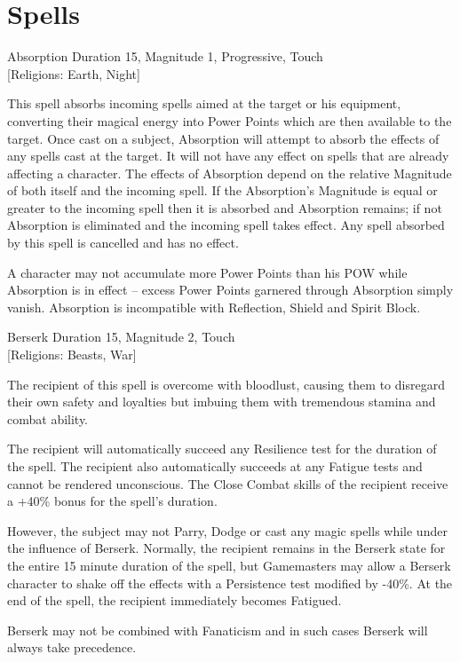 \section{Spells}

\begin{rpg-spell}
{Absorption}
{Duration 15, Magnitude 1, Progressive, Touch\\{[Religions: Earth, Night]}}

This spell absorbs incoming spells aimed at the target or his equipment, converting their magical energy into Power Points which are then available to the target. Once cast on a subject, Absorption will attempt to absorb the effects of any spells cast at the target. It will not have any effect on spells that are already affecting a character. The effects of Absorption depend on the relative Magnitude of both itself and the incoming spell. If the Absorption's Magnitude is equal or greater to the incoming spell then it is absorbed and Absorption remains; if not Absorption is eliminated and the incoming spell takes effect. Any spell absorbed by this spell is cancelled and has no effect. 

A character may not accumulate more Power Points than his POW while Absorption is in effect – excess Power Points garnered through Absorption simply vanish. Absorption is incompatible with Reflection, Shield and Spirit Block.
\end{rpg-spell}

\begin{rpg-spell}
{Berserk}
{Duration 15, Magnitude 2, Touch\\{[Religions: Beasts, War]}}

The recipient of this spell is overcome with bloodlust, causing them to disregard their own safety and loyalties but imbuing them with tremendous stamina and combat ability. 

The recipient will automatically succeed any Resilience test for the duration of the spell. The recipient also automatically succeeds at any Fatigue tests and cannot be rendered unconscious. The Close Combat skills of the recipient receive a +40\% bonus for the spell’s duration. 

However, the subject may not Parry, Dodge or cast any magic spells while under the influence of Berserk. Normally, the recipient remains in the Berserk state for the entire 15 minute duration of the spell, but Gamemasters may allow a Berserk character to shake off the effects with a Persistence test modified by -40\%. At the end of the spell, the recipient immediately becomes Fatigued. 

Berserk may not be combined with Fanaticism and in such cases Berserk will always take precedence. 
\end{rpg-spell}

